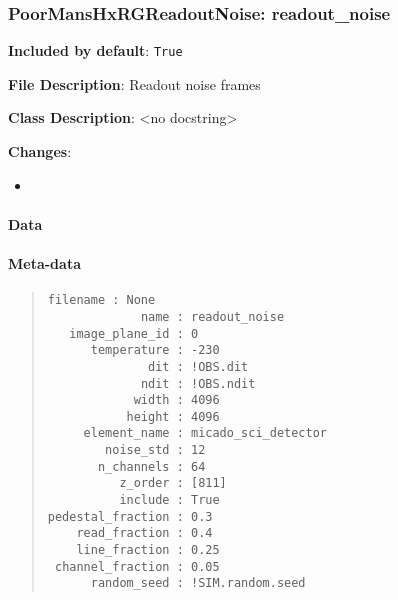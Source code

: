 \subsubsection{PoorMansHxRGReadoutNoise: \textquotedbl{}readout\_noise\textquotedbl{}%
  \label{poormanshxrgreadoutnoise-readout-noise}%
}

\textbf{Included by default}: \texttt{True}

\textbf{File Description}: Readout noise frames

\textbf{Class Description}: <no docstring>

\textbf{Changes}:

\begin{itemize}
\item \end{itemize}


\paragraph{Data%
  \label{id9}%
}


\paragraph{Meta-data%
  \label{id10}%
}

\begin{quote}
\begin{alltt}
\begin{lstlisting}[frame=single]
         filename : None
             name : readout_noise
   image_plane_id : 0
      temperature : -230
              dit : !OBS.dit
             ndit : !OBS.ndit
            width : 4096
           height : 4096
     element_name : micado_sci_detector
        noise_std : 12
       n_channels : 64
          z_order : [811]
          include : True
pedestal_fraction : 0.3
    read_fraction : 0.4
    line_fraction : 0.25
 channel_fraction : 0.05
      random_seed : !SIM.random.seed
\end{lstlisting}
\end{alltt}
\end{quote}
